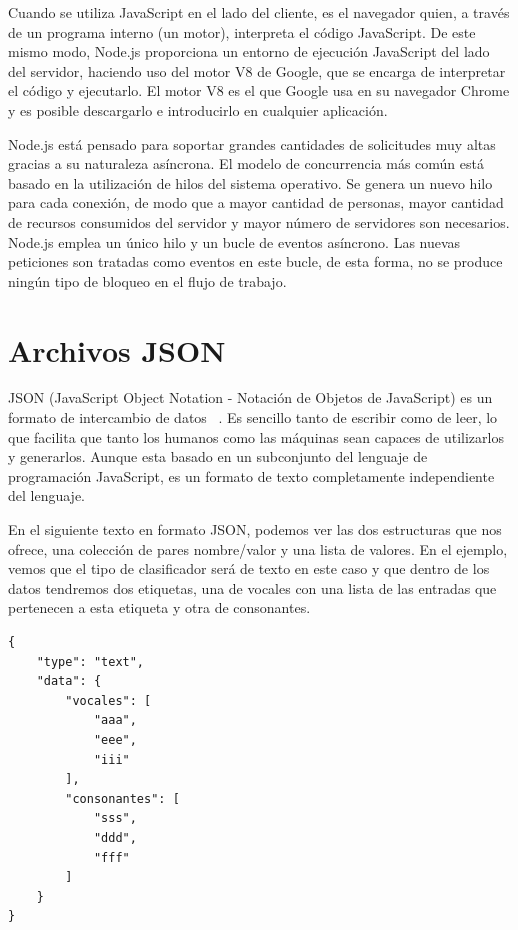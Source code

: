 \documentclass[a4paper, 12pt]{book}
\begin{document}
Cuando se utiliza JavaScript en el lado del cliente, es el navegador quien, a través de un programa interno (un motor), interpreta el código JavaScript. De este mismo modo, Node.js proporciona un entorno de ejecución JavaScript del lado del servidor, haciendo uso del motor V8 de Google, que se encarga de interpretar el código y ejecutarlo.
El motor V8 es el que Google usa en su navegador Chrome y es posible descargarlo e introducirlo en cualquier aplicación.

Node.js está pensado para soportar grandes cantidades de solicitudes muy altas gracias a su naturaleza asíncrona. El modelo de concurrencia más común está basado en la utilización de hilos del sistema operativo. Se genera un nuevo hilo para cada conexión, de modo que a mayor cantidad de personas, mayor cantidad de recursos consumidos del servidor y mayor número de servidores son necesarios. Node.js emplea un único hilo y un bucle de eventos asíncrono. Las nuevas peticiones son tratadas como eventos en este bucle, de esta forma, no se produce ningún tipo de bloqueo en el flujo de trabajo.

\section{Archivos JSON} 
\label{sec:archivosjson}

JSON (JavaScript Object Notation - Notación de Objetos de JavaScript) es un formato de intercambio de datos ~\cite{json}. Es sencillo tanto de escribir como de leer, lo que facilita que tanto los humanos como las máquinas sean capaces de utilizarlos y generarlos. Aunque esta basado en un subconjunto del lenguaje de programación JavaScript, es un formato de texto completamente independiente del lenguaje.

En el siguiente texto en formato JSON, podemos ver las dos estructuras que nos ofrece, una colección de pares nombre/valor y una lista de valores. En el ejemplo, vemos que el tipo de clasificador será de texto en este caso y que dentro de los datos tendremos dos etiquetas, una de vocales con una lista de las entradas que pertenecen a esta etiqueta y otra de consonantes. 

\begin{verbatim}
{
    "type": "text",
    "data": {
        "vocales": [
            "aaa",
            "eee",
            "iii"
        ],
        "consonantes": [
            "sss",
            "ddd",
            "fff"
        ]
    }
}
\end{verbatim}
\end{document}
